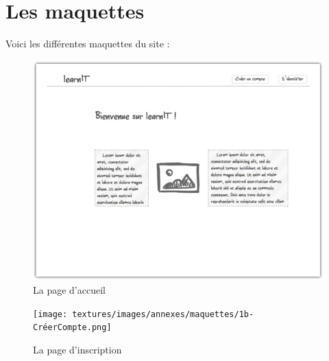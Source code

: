 \section*{Les maquettes}
\label{sec:maquettes}

Voici les différentes maquettes du site :

\begin{figure}[!h]
    \centering
    \includegraphics[scale=1]{textures/images/annexes/maquettes/1a-Home.png}
    \caption{La page d'accueil}
\end{figure}
\begin{figure}[!h]
    \centering
    \texttt{[image: textures/images/annexes/maquettes/1b-CréerCompte.png]}
    \caption{La page d'inscription}
\end{figure}

\newpage

